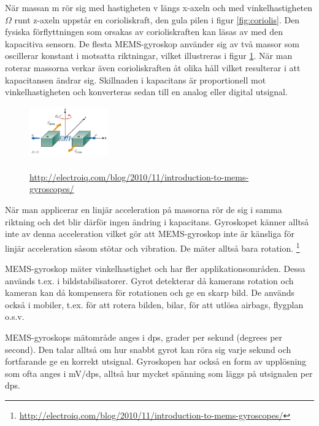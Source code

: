 \documentclass[a4paper,12pt,fleqn]{article}
\begin{document}
När massan m rör sig med hastigheten v längs x-axeln och med vinkelhastigheten $\Omega$ runt z-axeln uppstår en corioliskraft, den gula pilen i figur \ref{fig:coriolis}. Den fysiska förflyttningen som orsakas av corioliskraften kan läsas av med den kapacitiva sensorn. De flesta MEMS-gyroskop använder sig av två massor som oscillerar konstant i motsatta riktningar, vilket illustreras i figur \ref{fig:angular}. När man roterar massorna verkar även corioliskraften åt olika håll vilket resulterar i att kapacitansen ändrar sig. Skillnaden i kapacitans är proportionell mot vinkelhastigheten och konverteras sedan till en analog eller digital utsignal.

\begin{figure}[h]
\begin{center}
\includegraphics[width=0.3\textwidth]
{angularv.png}
\caption{\\\url{http://electroiq.com/blog/2010/11/introduction-to-mems-gyroscopes/}}
\label{fig:angular}
\end{center}
\end{figure}


När man applicerar en linjär acceleration på massorna rör de sig i samma riktning och det blir därför ingen ändring i kapacitans. Gyroskopet känner alltså inte av denna acceleration vilket gör att MEMS-gyroskop inte är känsliga för linjär acceleration såsom stötar och vibration. De mäter alltså bara rotation.
\footnote{\url{http://electroiq.com/blog/2010/11/introduction-to-mems-gyroscopes/}}


MEMS-gyroskop mäter vinkelhastighet och har fler applikationsområden. Dessa används t.ex. i bildstabilisatorer. Gyrot detekterar då kamerans rotation och kameran kan då kompensera för rotationen och ge en skarp bild. De används också i mobiler, t.ex. för att rotera bilden, bilar, för att utlösa airbags, flygplan o.s.v.

MEMS-gyroskops mätområde anges i dps, grader per sekund (degrees per second). Den talar alltså om hur snabbt gyrot kan röra sig varje sekund och fortfarande ge en korrekt utsignal. Gyroskopen har också en form av upplösning som ofta anges i mV/dps, alltså hur mycket spänning som läggs på utsignalen per dps.
\end{document}
